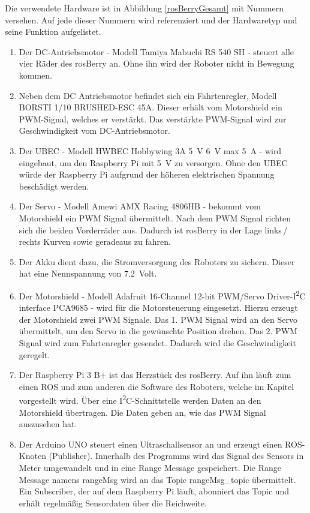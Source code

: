 \documentclass[conference]{IEEEtran}
\begin{document}
	Die verwendete Hardware ist in Abbildung \ref{rosBerryGesamt} mit Nummern versehen.
	Auf jede dieser Nummern wird referenziert und der Hardwaretyp und 
	seine Funktion aufgelistet.
	
	\begin{enumerate}
		\item Der DC-Antriebsmotor - Modell Tamiya Mabuchi RS 540 SH - steuert alle vier Räder des rosBerry an.
		Ohne ihn wird der Roboter nicht in Bewegung kommen.
		\item Neben dem DC Antriebsmotor befindet sich ein Fahrtenregler, Modell BORSTI 1/10 BRUSHED-ESC 45A.
		Dieser erhält vom Motorshield ein PWM-Signal, welches er verstärkt.
		Das verstärkte PWM-Signal wird zur Geschwindigkeit vom 
		DC-Antriebsmotor.
		\item Der UBEC - Modell HWBEC Hobbywing 3A \SI{5}{V} \SI{6}{V} max \SI{5}{A} - wird eingebaut, um den Raspberry Pi mit \SI{5}{V} zu versorgen.
		Ohne den UBEC würde der Raspberry Pi aufgrund der höheren elektrischen Spannung beschädigt werden.
		\item Der Servo - Modell Amewi AMX Racing 4806HB - bekommt vom Motorshield ein PWM Signal übermittelt.
		Nach dem PWM Signal richten sich die beiden Vorderräder aus.
		Dadurch ist rosBerry in der Lage links\,/\,rechts Kurven sowie geradeaus zu fahren.
		\item Der Akku dient dazu, die Stromversorgung des Roboters zu sichern.
		Dieser hat eine Nennspannung von \SI{7,2}{Volt}. 
		\item Der Motorshield - Modell Adafruit 16-Channel 12-bit PWM/Servo 
		Driver-I\textsuperscript{2}C interface PCA9685 - wird für die 
		Motorsteuerung eingesetzt.
		Hierzu erzeugt der Motorshield zwei PWM Signale.
		Das 1. PWM Signal wird an den Servo übermittelt, um den Servo in die 
		gewünschte Position drehen.
		Das 2. PWM Signal wird zum Fahrtenregler gesendet.
		Dadurch wird die Geschwindigkeit geregelt.
		\item Der Raspberry Pi 3 B+ ist das Herzstück des rosBerry.
		Auf ihn läuft zum einen ROS und zum anderen die Software des Roboters, welche im Kapitel  vorgestellt wird.
		Über eine I\textsuperscript{2}C-Schnittstelle werden Daten an den 
		Motorshield übertragen.
		Die Daten geben an, wie das PWM Signal auszusehen hat.
		\item Der Arduino UNO steuert einen Ultraschallsensor an und erzeugt 
		einen ROS-Knoten (Publisher).
		Innerhalb des Programms wird das Signal des Sensors in Meter umgewandelt und in eine Range Message gespeichert.
		Die Range Message namens rangeMsg wird an das Topic rangeMsg\_topic übermittelt.
		Ein Subscriber, der auf dem Raspberry Pi läuft, abonniert das Topic und erhält regelmäßig Sensordaten über die Reichweite.
		

\end{enumerate}
\end{document}

